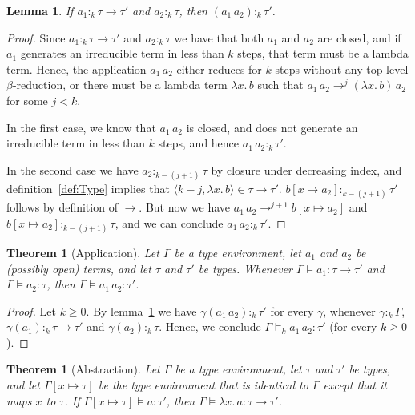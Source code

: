 \documentclass[10pt,a4paper,draft,twocolumn]{article}
\theoremstyle{definition}
\theoremstyle{plain}
\newtheorem{lemma}[definition]{Lemma}
\newtheorem{theorem}[definition]{Theorem}
\newcommand{\abstr}[2]{\ensuremath{\lambda{#1}.\,{#2}}}
\newcommand{\app}[2]{\ensuremath{{#1}\,{#2}}}
\newcommand{\pair}[1]{\ensuremath{\langle{#1}\rangle}}
\begin{document}
\begin{lemma} \label{lem:Application}
  If $a_1 :_k \tau \to \tau'$ and $a_2 :_k \tau$, then $(\app{a_1}{a_2}) :_k \tau'$.
\end{lemma}

\begin{proof}
  Since $a_1 :_k \tau \to \tau'$ and $a_2 :_k \tau$ we have that both $a_1$ and $a_2$ are closed,
  and if $a_1$ generates an irreducible term in less than $k$ steps, that term must be a lambda
  term. Hence, the application $\app{a_1}{a_2}$ either reduces for $k$ steps without any top-level
  $\beta$-reduction, or there must be a lambda term $\abstr{x}{b}$ such that
  $\app{a_1}{a_2} \to^j \app{(\abstr{x}{b})}{a_2}$ for some $j < k$.

  In the first case, we know that $\app{a_1}{a_2}$ is closed, and does not generate an irreducible
  term in less than $k$ steps, and hence $\app{a_1}{a_2} :_k \tau'$.

  In the second case we have $a_2 :_{k-(j+1)} \tau$ by closure under decreasing index, and
  definition~\ref{def:Type} implies that $\pair{k-j,\abstr{x}{b}} \in \tau \to \tau'$.
  $b[x \mapsto a_2] :_{k-(j+1)} \tau'$ follows by definition of $\to$. But now we have
  $\app{a_1}{a_2} \to^{j+1} b[x \mapsto a_2]$ and $b[x \mapsto a_2] :_{k-(j+1)} \tau$, and
  we can conclude $\app{a_1}{a_2} :_k \tau'$.
\end{proof}

\begin{theorem}[Application] \label{thm:Application}
  Let $\Gamma$ be a type environment, let $a_1$ and $a_2$ be (possibly open) terms, and let
  $\tau$ and $\tau'$ be types. Whenever $\Gamma \models a_1 : \tau \to \tau'$ and $\Gamma \models a_2 : \tau$,
  then $\Gamma \models \app{a_1}{a_2} : \tau'$.
\end{theorem}

\begin{proof}
  Let $k \ge 0$. By lemma~\ref{lem:Application} we have
  $\gamma(\app{a_1}{a_2}) :_k \tau'$ for every $\gamma$, whenever $\gamma :_k \Gamma$,
  $\gamma(a_1) :_k \tau \to \tau'$ and $\gamma(a_2) :_k \tau$. Hence, we conclude
  $\Gamma \models_k \app{a_1}{a_2} : \tau'$ (for every $k \ge 0$).
\end{proof}

\begin{theorem}[Abstraction] \label{thm:Abstraction}
  Let $\Gamma$ be a type environment, let $\tau$ and $\tau'$ be types, and let $\Gamma[x \mapsto \tau]$
  be the type environment that is identical to $\Gamma$ except that it maps $x$ to $\tau$. If
  $\Gamma[x \mapsto \tau] \models a : \tau'$, then $\Gamma \models \abstr{x}{a} : \tau \to \tau'$.
\end{theorem}
\end{document}
